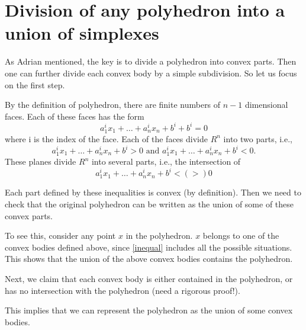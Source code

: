\section{Division of any polyhedron into a union of simplexes}
As Adrian mentioned, the key is to divide a polyhedron into convex parts. Then one can further divide each convex body by a simple subdivision. So let us focus on the first step.

By the definition of polyhedron, there are finite numbers of $n-1$ dimensional faces. Each of these faces has the form 
$$
a^i_1 x_1 + \ldots + a^i_n x_n +b^i +b^i= 0 
$$
where i is the index of the face.  Each of the faces divide $R^n$ into two parts, i.e.,  
$$
a^i_1 x_1 + \ldots + a^i_n x_n +b^i> 0 \mbox{ and } a^i_1 x_1 + \ldots + a^i_n x_n +b^i< 0. 
$$
These planes divide $R^n$ into several parts, i.e., the intersection of  
\begin{equation}\label{inequal}
  a^i_1 x_1 + \ldots + a^i_n x_ n +b^i<(>) 0
\end{equation}


Each part defined by these inequalities is convex (by definition). Then we need to check that the original polyhedron can be written as the union of some of these convex parts. 

To see this, consider any point $x$ in the polyhedron. $x$ belongs to one of the convex bodies defined above, since \eqref{inequal} includes all the possible situations. This shows that the union of the above convex bodies contains the polyhedron.

Next, we claim that each convex body is either contained in the polyhedron, or has no intersection with the polyhedron (need a rigorous proof!). 

This implies that we can represent the polyhedron as the union of some convex bodies.


\endinput
\subsection{Discussion with Lin}

Prof Ocneanu builds up a connection between polygon and binary tree.
\begin{itemize}
\item A hyperplane can cut a polygon into two polygons. The hyperplane can be regarded as a node, and the divided polygons can be seen as sub-binary trees.
\item Follow the steps above to get more sub-binary trees.
\item According to binary tree algorithm you will git a algorithm of cutting polygon.
\end{itemize}

Because of finiteness of polygon, the operator will be end. We can cut a polygon into simplices.

The other thing that is very interesting is that if you cut with a hyperplane, then the other polygons are only on one side of the hyperplane, which may not be connected, but increases the convexity, which guarantees convex.


